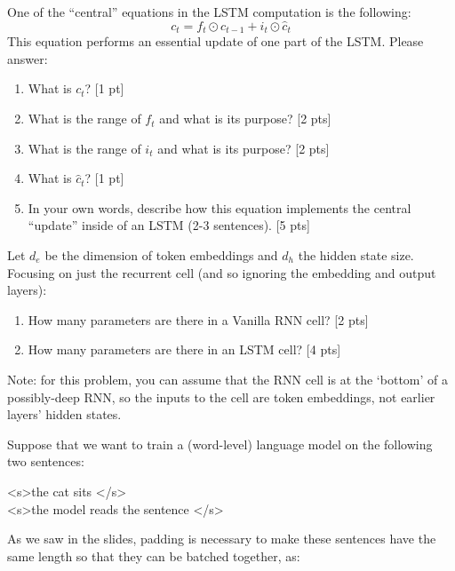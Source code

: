 \documentclass[11pt]{article}
\newcommand{\bos}{\textless s\textgreater\:}
\newcommand{\eos}{\textless /s\textgreater\:}
\begin{document}
\vspace{2em}
  One of the ``central'' equations in the LSTM computation is the following:
\[ c_t = f_t \odot c_{t-1} + i_t \odot \hat{c}_t \]
This equation performs an essential update of one part of the LSTM.  Please answer:
\begin{enumerate}[label=\alph*., itemsep=2em]
  \item What is $c_t$? [1 pt]
  \item What is the range of $f_t$ and what is its purpose? [2 pts]
  \item What is the range of $i_t$ and what is its purpose? [2 pts]
  \item What is $\hat{c}_t$? [1 pt]
  \item In your own words, describe how this equation implements the central ``update'' inside of an LSTM (2-3 sentences). [5 pts]
\end{enumerate}

\vspace{2em}
  Let $d_e$ be the dimension of token embeddings and $d_h$ the hidden state size.  Focusing on just the recurrent cell (and so ignoring the embedding and output layers):
\begin{enumerate}[label=\alph*., itemsep=2em]
  \item How many parameters are there in a Vanilla RNN cell? [2 pts]
  \item How many parameters are there in an LSTM cell? [4 pts]
\end{enumerate}

\vspace{2em}
Note: for this problem, you can assume that the RNN cell is at the `bottom' of a possibly-deep RNN, so the inputs to the cell are token embeddings, not earlier layers' hidden states.

\vspace{2em}
  Suppose that we want to train a (word-level) language model on the following two sentences:

\begin{center}
  \bos the cat sits \eos \\
  \bos the model reads the sentence \eos
\end{center}

As we saw in the slides, padding is necessary to make these sentences have the same length so that they can be batched together, as:
\end{document}
